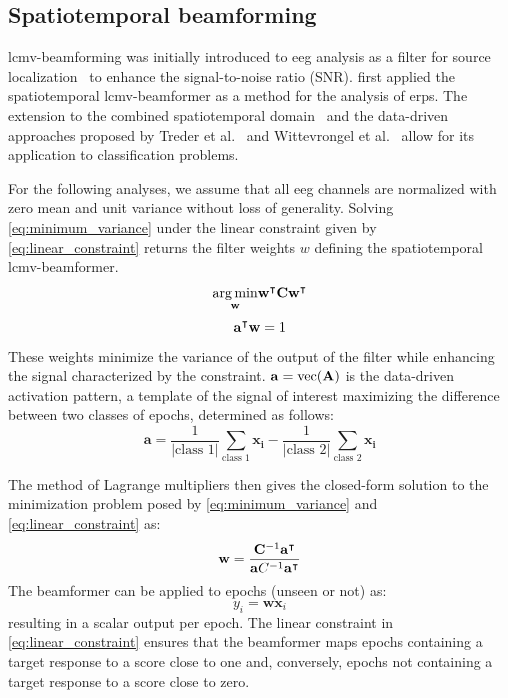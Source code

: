 	\subsection{Spatiotemporal beamforming}
  \ac{lcmv}-beamforming was initially introduced to \ac{eeg} analysis as a filter for
	source localization~\cite{VanVeen1997} to enhance the signal-to-noise ratio
	(SNR).
	\textcite{VanVliet2015} first applied the spatiotemporal
	\ac{lcmv}-beamformer as a method for the analysis of \acp{erp}.
	The extension to the combined spatiotemporal domain~\cite{VanVliet2015} and the
	data-driven approaches proposed by Treder et al.~\cite{Treder2016} and
	Wittevrongel et al.~\cite{Wittevrongel2016} allow for its application to classification problems.

	For the following analyses, we assume that all \ac{eeg} channels are normalized with zero mean and unit variance without loss of generality.
	Solving \cref{eq:minimum_variance} under the linear constraint given by
	\cref{eq:linear_constraint} returns the filter weights $w$ defining the spatiotemporal \ac{lcmv}-beamformer.
	\begin{equation}
    \underset{\mathbf{w}}{\arg\min}\mathbf{w}^\intercal \mathbf{C}
		\mathbf{w}^\intercal
		\label{eq:minimum_variance}
	\end{equation}
	\begin{equation}
		\mathbf{a}^\intercal\mathbf{w} = 1
		\label{eq:linear_constraint}
	\end{equation}
	These weights minimize the variance of the output of the filter while enhancing
	the signal characterized by the constraint.
  $\mathbf{a} = \text{vec}(\mathbf{A})$ is the data-driven activation pattern, a template
	of the signal of interest maximizing the difference between two classes of
	epochs, determined as follows:
	\begin{equation}
		\mathbf{a} =
		\frac{1}{|\text{class 1}|}\sum_\text{class 1}\mathbf{x_i} -
		\frac{1}{|\text{class 2}|}\sum_\text{class 2}\mathbf{x_i}
		\label{eq:activation_pattern}
	\end{equation}

	The method of Lagrange multipliers then gives the closed-form solution to the minimization problem posed by
	\cref{eq:minimum_variance} and \cref{eq:linear_constraint} as:
	\begin{equation}
		\mathbf{w} =
    \frac{\mathbf{C}^{-1}\mathbf{a}^\intercal}
		{\mathbf{a}C^{-1}\mathbf{a}^\intercal}
		\label{eq:closed_form}
	\end{equation}
	The beamformer can be applied to epochs (unseen or not) as:
	\begin{equation}
		y_i = \mathbf{w}\mathbf{x}_i
		\label{eq:apply_beamformer}
	\end{equation}
	resulting in a scalar output per epoch.
	The linear constraint in \cref{eq:linear_constraint} ensures that the
	beamformer maps epochs containing a target response to a score close to one
	and, conversely, epochs not containing a target response to a score close to
	zero.

